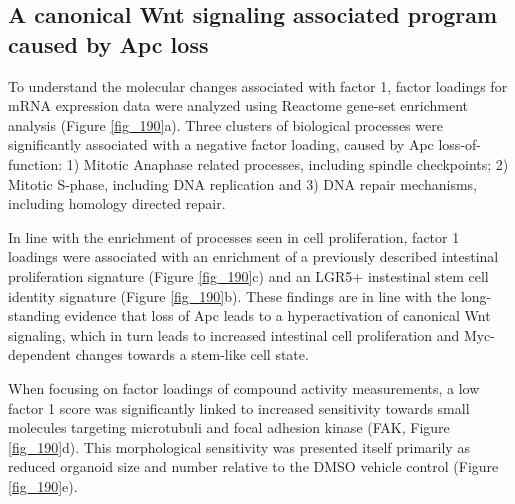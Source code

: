 \begin{flushleft}
\section{A canonical Wnt signaling associated program caused by Apc loss}

To understand the molecular changes associated with factor 1, factor loadings for mRNA expression data were analyzed using Reactome gene-set enrichment analysis (Figure \ref{fig_190}a). Three clusters of biological processes were significantly associated with a negative factor loading, caused by Apc loss-of-function: 1) Mitotic Anaphase related processes, including spindle checkpoints; 2) Mitotic S-phase, including DNA replication and 3) DNA repair mechanisms, including homology directed repair. 

In line with the enrichment of processes seen in cell proliferation, factor 1 loadings were associated with an enrichment of a previously described intestinal proliferation signature (Figure \ref{fig_190}c) and an LGR5+ instestinal stem cell identity signature (Figure \ref{fig_190}b). These findings are in line with the long-standing evidence that loss of Apc leads to a hyperactivation of canonical Wnt signaling, which in turn leads to increased intestinal cell proliferation and Myc-dependent changes towards a stem-like cell state.

When focusing on factor loadings of compound activity measurements, a low factor 1 score was significantly linked to increased sensitivity towards small molecules targeting microtubuli and focal adhesion kinase (FAK, Figure \ref{fig_190}d). This morphological sensitivity was presented itself primarily as reduced organoid size and number relative to the DMSO vehicle control (Figure \ref{fig_190}e).



\end{flushleft}
